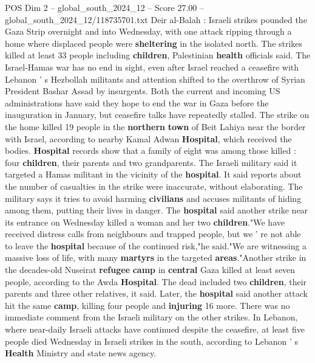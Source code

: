 \begin{textsample}{POS Dim 2 – global\_south\_2024\_12 – Score 27.00 – global\_south\_2024\_12/118735701.txt}  \label{ex:f2_pos_068}
Deir al-Balah : Israeli strikes pounded the Gaza Strip overnight and into Wednesday, with one attack ripping through a home where displaced people were \textbf{sheltering} in the isolated north.
The strikes killed at least 33 people including \textbf{children}, Palestinian \textbf{health} officials said.
The Israel-Hamas war has no end in sight, even after Israel reached a ceasefire with Lebanon ' s Hezbollah militants and attention shifted to the overthrow of Syrian President Bashar Assad by insurgents.
Both the current and incoming US administrations have said they hope to end the war in Gaza before the inauguration in January, but ceasefire talks have repeatedly stalled.
The strike on the home killed 19 people in the \textbf{northern} \textbf{town} of Beit Lahiya near the border with Israel, according to nearby Kamal Adwan \textbf{Hospital}, which received the bodies. \textbf{Hospital} records show that a family of eight was among those killed : four \textbf{children}, their parents and two grandparents.
The Israeli military said it targeted a Hamas militant in the vicinity of the \textbf{hospital}.
It said reports about the number of casualties in the strike were inaccurate, without elaborating.
The military says it tries to avoid harming \textbf{civilians} and accuses militants of hiding among them, putting their lives in danger.
The \textbf{hospital} said another strike near its entrance on Wednesday killed a woman and her two \textbf{children}."We have received distress calls from neighbours and trapped people, but we ' re not able to leave the \textbf{hospital} because of the continued risk,"he said."We are witnessing a massive loss of life, with many \textbf{martyrs} in the targeted \textbf{areas}."Another strike in the decades-old Nuseirat \textbf{refugee} \textbf{camp} in \textbf{central} Gaza killed at least seven people, according to the Awda \textbf{Hospital}.
The dead included two \textbf{children}, their parents and three other relatives, it said.
Later, the \textbf{hospital} said another attack hit the same \textbf{camp}, killing four people and \textbf{injuring} 16 more.
There was no immediate comment from the Israeli military on the other strikes.
In Lebanon, where near-daily Israeli attacks have continued despite the ceasefire, at least five people died Wednesday in Israeli strikes in the south, according to Lebanon ' s \textbf{Health} Ministry and state news agency.

\end{textsample}
